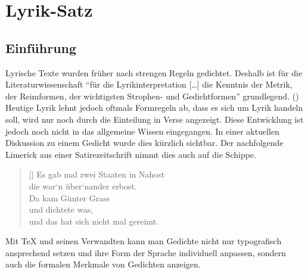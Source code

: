 

%



%


\section{Lyrik-Satz}
 

\subsection{Einführung}

Lyrische Texte wurden früher nach strengen Regeln gedichtet. Deshalb ist für 
die Literaturwissenschaft "`für
die Lyrikinterpretation [\ldots] die Kenntnis der Metrik, der Reimformen, der
wichtigsten Strophen- und Gedichtformen"' grundlegend. (\cite[S.\,8]{Neuhaus})
Heutige Lyrik lehnt jedoch oftmals Formregeln ab, dass es sich um Lyrik handeln
soll, wird nur noch durch die Einteilung in Verse angezeigt. Diese Entwicklung ist
jedoch noch nicht in das allgemeine Wissen eingegangen. In einer aktuellen Diskussion 
zu einem Gedicht wurde dies kürzlich sichtbar. Der nachfolgende 
Limerick \cite{Svoboda} aus einer Satirezeitschrift nimmt dies auch auf die Schippe.
\settowidth{\versewidth}{und das hat sich nicht mal gereimt.}
\begin{verse}[\versewidth]
Es gab mal zwei Staaten in Nahost\\
die war`n über`nander erbost.\\
\vin Da kam Günter Grass\\
\vin \vin und dichtete was,\\
und das hat sich nicht mal gereimt.\\
\end{verse}

Mit \TeX{} und seinen Verwandten kann man Gedichte nicht nur typografisch
ansprechend setzen  und ihre Form der Sprache individuell anpassen, sondern auch die 
formalen Merkmale von Gedichten anzeigen. 

